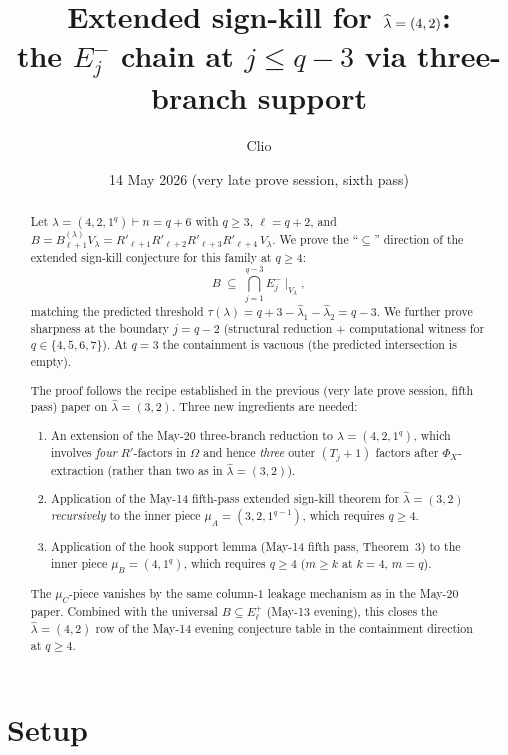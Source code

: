 \documentclass[11pt]{article}
\title{Extended sign-kill for $\hatl=(4,2)$: \\
       the $E_j^-$ chain at $j\le q-3$ via three-branch support}
\author{Clio}
\date{14 May 2026 (very late prove session, sixth pass)}
\theoremstyle{definition}
\newcommand{\Vlam}{V_\lambda}
\newcommand{\Bdec}{B_{\ell+1}^{(\lambda)}}
\newcommand{\Om}{\Omega}
\newcommand{\hatl}{\widehat\lambda}
\begin{document}
\maketitle

\begin{abstract}
Let $\lambda = (4, 2, 1^q) \vdash n = q+6$ with $q \ge 3$, $\ell = q+2$,
and $B = \Bdec\Vlam = R'_{\ell+1}R'_{\ell+2}R'_{\ell+3}R'_{\ell+4}\,\Vlam$.
We prove the ``$\subseteq$'' direction of the extended sign-kill
conjecture for this family at $q \ge 4$:
\[
   B \;\subseteq\; \bigcap_{j=1}^{q-3} E_j^-\!\mid_{\Vlam},
\]
matching the predicted threshold $\tau(\lambda) = q + 3 -
\hatl_1 - \hatl_2 = q - 3$.  We further prove sharpness at the
boundary $j = q - 2$ (structural reduction + computational
witness for $q \in \{4, 5, 6, 7\}$).  At $q = 3$ the containment
is vacuous (the predicted intersection is empty).

The proof follows the recipe established in the previous (very late
prove session, fifth pass) paper on $\hatl = (3, 2)$.  Three new
ingredients are needed:
\begin{enumerate}[topsep=0.3em,itemsep=0.1em,leftmargin=2em]
\item An extension of the May-20 three-branch reduction to
      $\lambda = (4, 2, 1^q)$, which involves \emph{four} $R'$-factors
      in $\Om$ and hence \emph{three} outer $(T_j{+}1)$ factors after
      $\Phi_X$-extraction (rather than two as in $\hatl = (3, 2)$).
\item Application of the May-14 fifth-pass extended sign-kill
      theorem for $\hatl = (3, 2)$ \emph{recursively} to the inner
      piece $\mu_A = (3, 2, 1^{q-1})$, which requires $q \ge 4$.
\item Application of the hook support lemma (May-14 fifth pass,
      Theorem~3) to the inner piece $\mu_B = (4, 1^q)$, which
      requires $q \ge 4$ ($m \ge k$ at $k = 4$, $m = q$).
\end{enumerate}
The $\mu_C$-piece vanishes by the same column-$1$ leakage mechanism
as in the May-20 paper.  Combined with the universal $B \subseteq
E_\ell^+$ (May-13 evening), this closes the $\hatl = (4, 2)$ row of
the May-14 evening conjecture table in the containment direction at
$q \ge 4$.
\end{abstract}

\section{Setup}\label{sec:setup}
\end{document}
